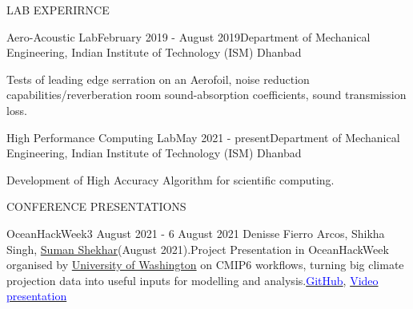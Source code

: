 \documentclass{resume} %
\begin{document}
\begin{rSection}{LAB EXPERIRNCE}

\begin{rSubsection}{Aero-Acoustic Lab}{February 2019 - August 2019}{Department of Mechanical Engineering, Indian Institute of Technology (ISM) Dhanbad}
\item Tests of leading edge serration on an Aerofoil, noise reduction capabilities/reverberation room sound-absorption coefficients, sound transmission loss.
\end{rSubsection}

\begin{rSubsection}{High Performance Computing Lab}{May 2021 - present}{Department of Mechanical Engineering, Indian Institute of Technology (ISM) Dhanbad}
\item Development of High Accuracy Algorithm for scientific computing.
\end{rSubsection}

\end{rSection}

\begin{rSection}{CONFERENCE PRESENTATIONS}
\begin{rSubsection}{OceanHackWeek}{3 August 2021 - 6 August 2021}{}
Denisse Fierro Arcos, Shikha Singh, \underline{Suman Shekhar}(August 2021).Project Presentation in OceanHackWeek organised by \underline{University of Washington}  on CMIP6 workflows, turning big climate projection data into useful inputs for modelling and analysis.\href{https://github.com/oceanhackweek/ohw21-proj-cmip-ard}{\textcolor{blue}{GitHub}}, \href{https://youtu.be/Y5e50p39mnQ}{\textcolor{blue}{Video presentation}}  
\end{rSubsection}
\end{rSection}
\end{document}
